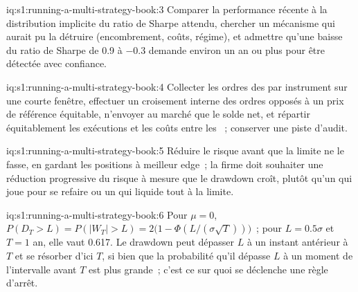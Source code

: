 \begin{solution}{iq:s1:running-a-multi-strategy-book:3}
Comparer la performance récente à la distribution implicite du ratio de Sharpe attendu, chercher un mécanisme qui aurait pu la détruire (encombrement, coûts,
régime), et admettre qu'une baisse du ratio de Sharpe de 0.9 à $-0.3$ demande environ un an ou plus pour être détectée avec confiance.
\end{solution}

\begin{solution}{iq:s1:running-a-multi-strategy-book:4}
Collecter les ordres des  par instrument sur une courte fenêtre, effectuer un croisement interne des ordres opposés à un prix de référence équitable, n'envoyer au marché que le solde net, et
répartir équitablement les exécutions et les coûts entre les ~; conserver une piste d'audit.
\end{solution}

\begin{solution}{iq:s1:running-a-multi-strategy-book:5}
Réduire le risque avant que la limite ne le fasse, en gardant les positions à meilleur edge~; la firme doit souhaiter une réduction progressive du risque à mesure que le drawdown croît,
plutôt qu'un  qui joue pour se refaire ou un  qui liquide tout à la limite.
\end{solution}

\begin{solution}{iq:s1:running-a-multi-strategy-book:6}
Pour $\mu = 0$, $P(D_T > L) = P(|W_T| > L) = 2\big(1 - \Phi(L/(\sigma\sqrt{T}))\big)$~; pour $L = 0.5\sigma$ et $T = 1$ an, elle vaut 0.617. Le drawdown peut
dépasser $L$ à un instant antérieur à $T$ et se résorber d'ici $T$, si bien que la probabilité qu'il dépasse $L$ à un moment de l'intervalle avant $T$ est plus grande~; c'est ce sur quoi
se déclenche une règle d'arrêt.
\end{solution}
